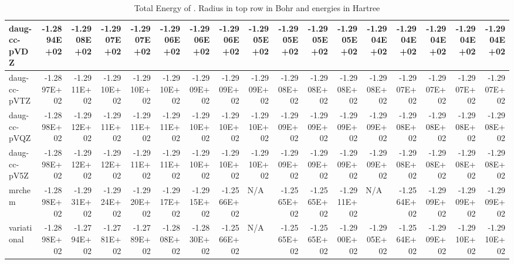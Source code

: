 \documentclass[../master_thesis.tex]{subfiles}
\begin{document}
\begin{table}
{{\begin{tabular}{|l|r|r|r|r|r|r|r|r|r|r|r|r|r|r|r|r|}
    daug-cc-pVDZ & -1.2894E+02 & -1.2908E+02 & -1.2907E+02 & -1.2907E+02 & -1.2906E+02 & -1.2906E+02 & -1.2906E+02 & -1.2905E+02 & -1.2905E+02 & -1.2905E+02 & -1.2905E+02 & -1.2904E+02 & -1.2904E+02 & -1.2904E+02 & -1.2904E+02 & -1.2904E+02 \\ \hline
    daug-cc-pVTZ & -1.2897E+02 & -1.2911E+02 & -1.2910E+02 & -1.2910E+02 & -1.2910E+02 & -1.2909E+02 & -1.2909E+02 & -1.2909E+02 & -1.2908E+02 & -1.2908E+02 & -1.2908E+02 & -1.2908E+02 & -1.2907E+02 & -1.2907E+02 & -1.2907E+02 & -1.2907E+02 \\ \hline
    daug-cc-pVQZ & -1.2898E+02 & -1.2912E+02 & -1.2911E+02 & -1.2911E+02 & -1.2911E+02 & -1.2910E+02 & -1.2910E+02 & -1.2910E+02 & -1.2909E+02 & -1.2909E+02 & -1.2909E+02 & -1.2909E+02 & -1.2908E+02 & -1.2908E+02 & -1.2908E+02 & -1.2908E+02 \\ \hline
    daug-cc-pV5Z & -1.2898E+02 & -1.2912E+02 & -1.2912E+02 & -1.2911E+02 & -1.2911E+02 & -1.2910E+02 & -1.2910E+02 & -1.2910E+02 & -1.2909E+02 & -1.2909E+02 & -1.2909E+02 & -1.2909E+02 & -1.2908E+02 & -1.2908E+02 & -1.2908E+02 & -1.2908E+02 \\ \hline
    mrchem & -1.2898E+02 & -1.2931E+02 & -1.2924E+02 & -1.2920E+02 & -1.2917E+02 & -1.2915E+02 & -1.2566E+02 & \multicolumn{1}{l|}{N/A} & -1.2565E+02 & -1.2565E+02 & -1.2911E+02 & \multicolumn{1}{l|}{N/A} & -1.2564E+02 & -1.2909E+02 & -1.2909E+02 & -1.2909E+02 \\ \hline
    variational & -1.2898E+02 & -1.2794E+02 & -1.2781E+02 & -1.2789E+02 & -1.2808E+02 & -1.2830E+02 & -1.2566E+02 & \multicolumn{1}{l|}{N/A} & -1.2565E+02 & -1.2565E+02 & -1.2900E+02 & -1.2905E+02 & -1.2564E+02 & -1.2909E+02 & -1.2910E+02 & -1.2910E+02 \\ \hline
  \end{tabular}}}{\caption{Total Energy of .  Radius in top row in Bohr and energies in Hartree}
  \label{tab:rawnopdata}}


\ttabbox{

}
\end{table}
\end{document}
